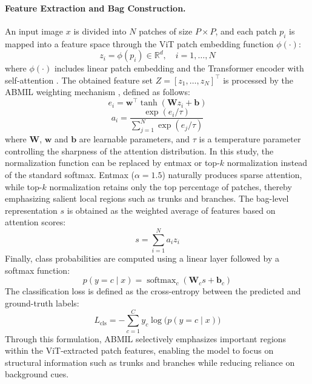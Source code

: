 \paragraph{Feature Extraction and Bag Construction.}
An input image $x$ is divided into $N$ patches of size $P\times P$, and each patch $p_i$ is mapped into a feature space through the ViT patch embedding function $\phi(\cdot)$:
\begin{equation}\tag{1}
z_i = \phi(p_i) \in \mathbb{R}^d,\quad i=1,\ldots,N
\end{equation}
where $\phi(\cdot)$ includes linear patch embedding and the Transformer encoder with self-attention \cite{ref1}. The obtained feature set $Z=[z_1,\ldots,z_N ]^\top$ is processed by the ABMIL weighting mechanism \cite{ref2}, defined as follows:
\begin{equation}\tag{2}
e_i=\bm{w}^\top \tanh(\mathbf{W} z_i + \bm{b})
\end{equation}
\begin{equation}\tag{3}
a_i=\frac{\exp(e_i/\tau)}{\sum_{j=1}^{N}\exp(e_j/\tau)}
\end{equation}
where $\mathbf{W}$, $\bm{w}$ and $\bm{b}$ are learnable parameters, and $\tau$ is a temperature parameter controlling the sharpness of the attention distribution. In this study, the normalization function can be replaced by entmax or top-$k$ normalization instead of the standard softmax. Entmax ($\alpha = 1.5$) naturally produces sparse attention, while top-$k$ normalization retains only the top percentage of patches, thereby emphasizing salient local regions such as trunks and branches. The bag-level representation $s$ is obtained as the weighted average of features based on attention scores:
\begin{equation}\tag{4}
s=\sum_{i=1}^N a_i z_i
\end{equation}
Finally, class probabilities are computed using a linear layer followed by a softmax function:
\begin{equation}\tag{5}
p(y=c \mid x)=\operatorname{softmax}_c (\mathbf{W}_c s+\bm{b}_c)
\end{equation}
The classification loss is defined as the cross-entropy between the predicted and ground-truth labels:
\begin{equation}\tag{6}
L_{\mathrm{cls}}=-\sum_{c=1}^{C} y_c \log\bigl(p(y=c\mid x)\bigr)
\end{equation}
Through this formulation, ABMIL selectively emphasizes important regions within the ViT-extracted patch features, enabling the model to focus on structural information such as trunks and branches while reducing reliance on background cues.

